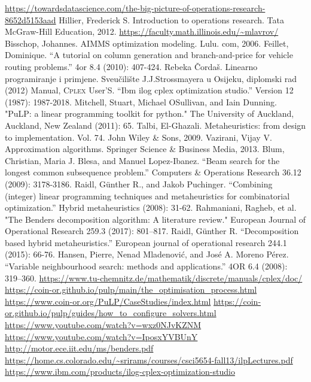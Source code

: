 \documentclass[a4paper, utf8, 11pt, colorlinks]{book}
\theoremstyle{definition}
\begin{document}
\begin{thebibliography}{widest entry}
	  \url{https://towardsdatascience.com/the-big-picture-of-operations-research-8652d5153aad}
	 Hillier, Frederick S. Introduction to operations research. Tata McGraw-Hill Education, 2012.
	  \url{https://faculty.math.illinois.edu/~mlavrov/}
	   Bisschop, Johannes. AIMMS optimization modeling. Lulu. com, 2006.
	   Feillet, Dominique. ``A tutorial on column generation and branch-and-price for vehicle routing problems.'' 4or 8.4 (2010): 407-424.
	    Rebeka Čordaš. Linearno programiranje i primjene. Sveu\v cili\v ste J.J.Strossmayera u Osijeku, diplomski rad (2012)
	     Manual, \textsc{Cplex} User’S. ``Ibm ilog cplex optimization studio.'' Version 12 (1987): 1987-2018.
	   Mitchell, Stuart, Michael OSullivan, and Iain Dunning. "PuLP: a linear programming toolkit for python." The University of Auckland, Auckland, New Zealand (2011): 65.
	      Talbi, El-Ghazali. Metaheuristics: from design to implementation. Vol. 74. John Wiley \& Sons, 2009.
	       Vazirani, Vijay V. Approximation algorithms. Springer Science \& Business Media, 2013.
	        Blum, Christian, Maria J. Blesa, and Manuel Lopez-Ibanez. ``Beam search for the longest common subsequence problem.'' Computers \& Operations Research 36.12 (2009): 3178-3186.
	      Raidl, Günther R., and Jakob Puchinger. ``Combining (integer) linear programming techniques and metaheuristics for combinatorial optimization.'' Hybrid metaheuristics (2008): 31-62.
	           Rahmaniani, Ragheb, et al. "The Benders decomposition algorithm: A literature review." European Journal of Operational Research 259.3 (2017): 801--817.
	         Raidl, Günther R. ``Decomposition based hybrid metaheuristics.'' European journal of operational research 244.1 (2015): 66-76.
	        Hansen, Pierre, Nenad Mladenović, and José A. Moreno Pérez. ``Variable neighbourhood search: methods and applications.'' 4OR 6.4 (2008): 319--360.
	       \url{https://www.tu-chemnitz.de/mathematik/discrete/manuals/cplex/doc/}%
	       \url{https://coin-or.github.io/pulp/main/the\_optimisation\_process.html}
	       \url{https://www.coin-or.org/PuLP/CaseStudies/index.html}
	        \url{https://coin-or.github.io/pulp/guides/how\_to\_configure\_solvers.html}
            \url{https://www.youtube.com/watch?v=wxz0NJvKZNM}
            \url{https://www.youtube.com/watch?v=IposxYVBUnY}
             \url{http://motor.ece.iit.edu/ms/benders.pdf}
             \url{https://home.cs.colorado.edu/\~srirams/courses/csci5654-fall13/ilpLectures.pdf}
    \url{https://www.ibm.com/products/ilog-cplex-optimization-studio}
  

\end{thebibliography}
\end{document}

